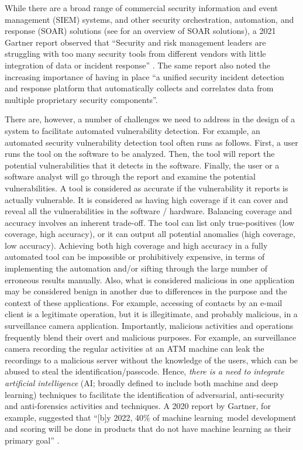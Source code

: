While there are a broad range of commercial security information and
event management (SIEM) systems, and other security orchestration,
automation, and response (SOAR) solutions
(see \cite{DBLP:journals/csur/IslamBN19} for an overview of SOAR
solutions), a 2021 Gartner report observed that ``Security and risk
management leaders are struggling with too many security tools from
different vendors with little integration of data or incident
response'' \cite{FirstbrookLawsonGartner2021}. The same report also
noted the increasing importance of having in place ``a unified
security incident detection and response platform that automatically
collects and correlates data from multiple proprietary security
components''.

There are, however, a number of challenges we need to address in the
design of a system to facilitate automated vulnerability detection.
For example, an automated security vulnerability detection tool often
runs as follows. First, a user runs the tool on the software to be
analyzed. Then, the tool will report the potential vulnerabilities
that it detects in the software. Finally, the user or a software
analyst will go through the report and examine the potential
vulnerabilities. A tool is considered as accurate if the vulnerability
it reports is actually vulnerable. It is considered as having high
coverage if it can cover and reveal all the vulnerabilities in the
software / hardware. Balancing coverage and accuracy involves an
inherent trade-off. The tool can list only true-positives (low
coverage, high accuracy), or it can output all potential anomalies
(high coverage, low accuracy). Achieving both high coverage and high
accuracy in a fully automated tool can be impossible or prohibitively
expensive, in terms of implementing the automation and/or sifting
through the large number of erroneous results manually.
Also, what is considered malicious in one application may be
considered benign in another due to differences in the purpose and the
context of these applications. For example, accessing of contacts by
an e-mail client is a legitimate operation, but it is illegitimate,
and probably malicious, in a surveillance camera
application. Importantly, malicious activities and operations
frequently blend their overt and malicious purposes. For example, an
surveillance camera recording the regular activities at an ATM machine
can leak the recordings to a malicious server without the knowledge of
the users, which can be abused to steal the
identification/passcode. Hence, {\em there is a need to integrate
artificial intelligence} (AI; broadly defined to include both machine
and deep learning) techniques to facilitate the identification of
adversarial, anti-security and anti-forensics activities and
techniques. A 2020 report by Gartner, for example, suggested that
``[b]y 2022, 40\% of machine learning~model development and scoring
will be done in products that do not have machine learning as their
primary goal'' \cite{RichardsonGartner2020}.

